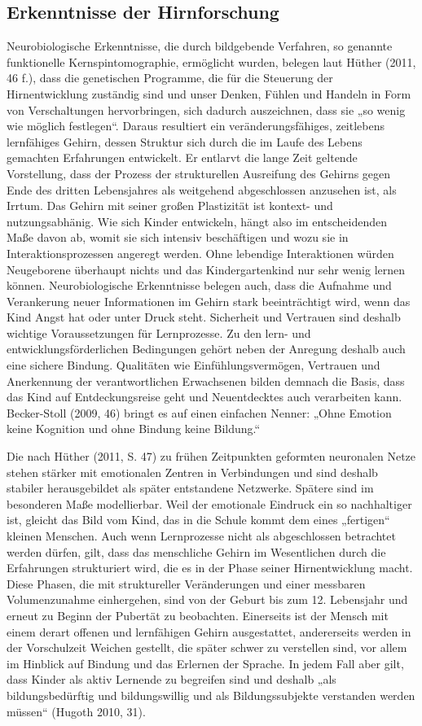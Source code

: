 \subsection{Erkenntnisse der Hirnforschung}
Neurobiologische Erkenntnisse, die durch bildgebende Verfahren, so genannte funktionelle Kernspintomographie, ermöglicht wurden,
belegen laut Hüther (2011, 46 f.), dass die genetischen Programme, die für die Steuerung der Hirnentwicklung zuständig sind und unser Denken, Fühlen und Handeln in Form von Verschaltungen hervorbringen, sich dadurch auszeichnen, dass sie „so wenig wie möglich festlegen“. Daraus resultiert ein veränderungsfähiges, zeitlebens lernfähiges Gehirn, dessen Struktur sich durch die im Laufe des Lebens gemachten Erfahrungen entwickelt. Er entlarvt die lange Zeit geltende Vorstellung, dass der Prozess der strukturellen Ausreifung des Gehirns gegen Ende des dritten Lebensjahres als weitgehend abgeschlossen anzusehen ist, als Irrtum. Das Gehirn mit seiner großen Plastizität ist kontext- und nutzungsabhänig. Wie sich Kinder entwickeln, hängt also im entscheidenden Maße davon ab, womit sie sich intensiv beschäftigen und wozu sie in Interaktionsprozessen angeregt werden. Ohne lebendige Interaktionen würden Neugeborene überhaupt nichts und das Kindergartenkind nur sehr wenig lernen können. Neurobiologische Erkenntnisse belegen auch, dass die Aufnahme und Verankerung neuer Informationen im Gehirn stark beeinträchtigt wird, wenn das Kind Angst hat oder unter Druck steht. Sicherheit und Vertrauen sind deshalb wichtige Voraussetzungen für Lernprozesse. Zu den lern- und entwicklungsförderlichen Bedingungen gehört neben der Anregung deshalb 
auch eine sichere Bindung. Qualitäten wie Einfühlungsvermögen, Vertrauen und Anerkennung der verantwortlichen Erwachsenen bilden demnach die Basis, dass das Kind auf Entdeckungsreise geht und Neuentdecktes auch verarbeiten kann.
Becker-Stoll (2009, 46) bringt es auf einen einfachen Nenner: „Ohne Emotion keine Kognition und ohne Bindung keine Bildung.“

Die nach Hüther (2011, S. 47) zu frühen Zeitpunkten geformten neuronalen Netze stehen stärker mit emotionalen Zentren in Verbindungen und sind deshalb stabiler herausgebildet als später entstandene Netzwerke. Spätere sind im besonderen Maße modellierbar.
 Weil der emotionale Eindruck ein so nachhaltiger ist, gleicht das Bild vom Kind, das in die Schule kommt dem eines „fertigen“ kleinen Menschen. Auch wenn Lernprozesse nicht als abgeschlossen betrachtet werden dürfen, gilt, dass das menschliche Gehirn im Wesentlichen durch die Erfahrungen strukturiert wird, die es in der Phase seiner Hirnentwicklung macht. 
Diese Phasen, die mit struktureller Veränderungen und einer messbaren Volumenzunahme einhergehen, sind von der Geburt bis zum 12. Lebensjahr und erneut zu Beginn der Pubertät zu beobachten. 
Einerseits ist der Mensch mit einem derart offenen und lernfähigen Gehirn ausgestattet, andererseits werden in der Vorschulzeit Weichen gestellt, die später schwer zu verstellen sind, vor allem im Hinblick auf Bindung und das Erlernen der Sprache.
In jedem Fall aber gilt, dass Kinder als aktiv Lernende zu begreifen sind und deshalb „als bildungsbedürftig und bildungswillig und als Bildungssubjekte verstanden werden müssen“ (Hugoth 2010, 31).
 

